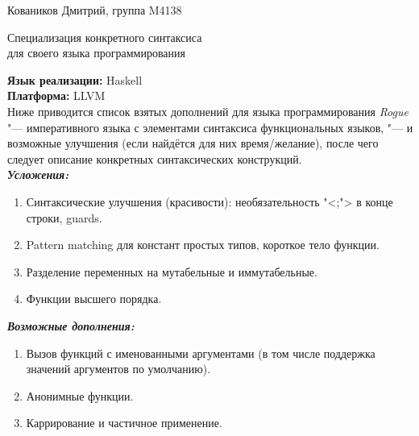 \documentclass[11pt,a4paper]{article}
\begin{document}

\begin{flushright}
  Коваников Дмитрий, группа M4138
\end{flushright}

\begin{center}
  \LARGE{Специализация конкретного синтаксиса\\
  для своего языка программирования\\}
\end{center}

\textbf{Язык реализации:} Haskell\\

\textbf{Платформа:} LLVM\\

Ниже приводится список взятых дополнений для языка программирования \textit{Rogue} "--- императивного языка с элементами синтаксиса функциональных языков, 
"--- и возможные улучшения (если найдётся для них время/желание), после чего следует описание конкретных синтаксических конструкций. \\

\textbf{\textit{Усложения:}}
\begin{enumerate}
    \item Синтаксические улучшения (красивости): необязательность "<;"> в конце строки, guards.
    \item Pattern matching для констант простых типов, короткое тело функции.
    \item Разделение переменных на мутабельные и иммутабельные.
    \item Функции высшего порядка.
\end{enumerate}

\textbf{\textit{Возможные дополнения:}}
\begin{enumerate}
    \item Вызов функций с именованными аргументами (в том числе поддержка значений аргументов по умолчанию).
    \item Анонимные функции.
    \item Каррирование и частичное применение.
\end{enumerate}
\end{document}
